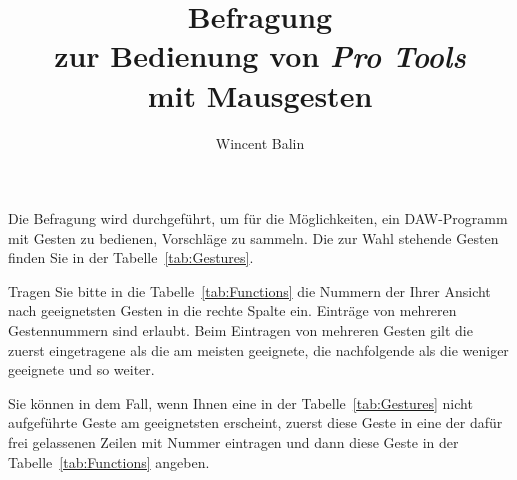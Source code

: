 \documentclass[11pt,a4paper,notitlepage]{article}
\author{Wincent Balin}
\title{Befragung\\zur Bedienung von \emph{Pro Tools}\\mit Mausgesten}
\begin{document}
\maketitle

Die Befragung wird durchgeführt, um für die Möglichkeiten, ein DAW-Programm mit Gesten zu bedienen, Vorschläge zu sammeln.
Die zur Wahl stehende Gesten finden Sie in der Tabelle~\ref{tab:Gestures}.

Tragen Sie bitte in die Tabelle~\ref{tab:Functions} die Nummern der Ihrer Ansicht nach geeignetsten Gesten
in die rechte Spalte ein. Einträge von mehreren Gestennummern sind erlaubt. Beim Eintragen von mehreren
Gesten gilt die zuerst eingetragene als die am meisten geeignete, die nachfolgende als die weniger geeignete
und so weiter.

Sie können in dem Fall, wenn Ihnen eine in der Tabelle~\ref{tab:Gestures} nicht aufgeführte Geste am geeignetsten
erscheint, zuerst diese Geste in eine der dafür frei gelassenen Zeilen mit Nummer eintragen und dann diese
Geste in der Tabelle~\ref{tab:Functions} angeben.

\newcommand{\rownumber}{\addtocounter{rownum}{1}\arabic{rownum}}
\setcounter{rownum}{0}

\newcommand{\quarterpic}[1][]{\texttt{[image: img/\#1]}}

\tablelasttail{\bottomrule}
\end{document}
